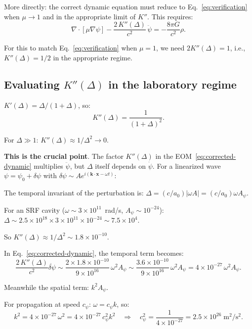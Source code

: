 \documentclass[11pt]{article}
\newcommand{\ee}[1]{\times 10^{#1}}
\begin{document}
More directly: the correct dynamic equation must reduce to
Eq.~\eqref{eq:verification} when $\mu \to 1$ and in the appropriate
limit of $K''$. This requires:
\begin{equation}
\boxed{
\nabla\cdot[\mu\nabla\psi]
- \frac{2\,K''(\Delta)}{c^2}\,\ddot\psi
= -\frac{8\pi G}{c^2}\rho.
}
\label{eq:corrected-dynamic}
\end{equation}

For this to match Eq.~\eqref{eq:verification} when $\mu = 1$, we
need $2K''(\Delta) = 1$, i.e., $K''(\Delta) = 1/2$ in the appropriate
regime.

\subsection{Evaluating $K''(\Delta)$ in the laboratory regime}

$K'(\Delta) = \Delta/(1+\Delta)$, so:
\begin{equation}
K''(\Delta) = \frac{1}{(1+\Delta)^2}.
\end{equation}

For $\Delta \gg 1$: $K''(\Delta) \approx 1/\Delta^2 \to 0$.

\textbf{This is the crucial point}. The factor $K''(\Delta)$ in the
EOM~\eqref{eq:corrected-dynamic} multiplies $\ddot\psi$, but $\Delta$
itself depends on $\dot\psi$. For a linearized wave
$\psi = \psi_0 + \delta\psi$ with $\delta\psi \sim A e^{i(\mathbf{k}\cdot\mathbf{x} - \omega t)}$:

The temporal invariant of the perturbation is:
$\Delta = (c/a_0)|\omega A| = (c/a_0)\omega A_\psi$.

For an SRF cavity ($\omega \sim 3\ee{11}$~rad/s, $A_\psi \sim 10^{-24}$):
$\Delta \sim 2.5\ee{18} \times 3\ee{11} \times 10^{-24} \sim 7.5\ee{4}$.

So $K''(\Delta) \approx 1/\Delta^2 \sim 1.8\ee{-10}$.

In Eq.~\eqref{eq:corrected-dynamic}, the temporal term becomes:
\begin{equation}
\frac{2\,K''(\Delta)}{c^2}\ddot{\delta\psi}
\sim \frac{2 \times 1.8\ee{-10}}{9\ee{16}}\,\omega^2 A_\psi
\sim \frac{3.6\ee{-10}}{9\ee{16}}\,\omega^2 A_\psi
= 4\ee{-27}\,\omega^2 A_\psi.
\end{equation}

Meanwhile the spatial term: $k^2 A_\psi$.

For propagation at speed $c_\psi$: $\omega = c_\psi k$, so:
\begin{equation}
k^2 = 4\ee{-27}\,\omega^2 = 4\ee{-27}\,c_\psi^2 k^2
\quad\Rightarrow\quad c_\psi^2 = \frac{1}{4\ee{-27}} = 2.5\ee{26}\;\text{m}^2/\text{s}^2.
\end{equation}
\end{document}
